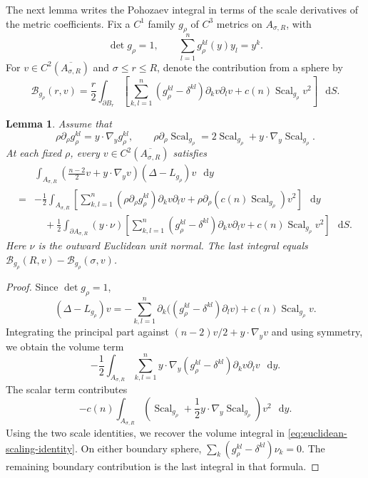 \documentclass[11pt]{article}
\numberwithin{equation}{section}
\newtheorem{lemma}[theorem]{Lemma}
\theoremstyle{remark}
\newcommand{\dd}{\mathop{}\!\mathrm{d}}
\begin{document}
The next lemma writes the Pohozaev integral in terms of the scale
derivatives of the metric coefficients. Fix a \(C^1\) family \(g_\rho\)
of \(C^3\) metrics on \(A_{\sigma,R}\), with
\[
 \det g_\rho=1,\qquad
 \sum_{l=1}^ng_\rho^{kl}(y)y_l=y^k.
\]
For \(v\in C^2(\overline{A_{\sigma,R}})\) and \(\sigma\le r\le R\),
denote the contribution from a sphere by
\begin{equation}\label{eq:scaling-boundary-term}
 \mathcal B_{g_\rho}(r,v)
 =\frac r2\int_{\partial B_r}
 \left[
 \sum_{k,l=1}^n(g_\rho^{kl}-\delta^{kl})\partial_kv\partial_lv
 +c(n)\operatorname{Scal}_{g_\rho}v^2
 \right]\,\dd S.
\end{equation}

\begin{lemma}\label{lem:euclidean-scaling-identity}
Assume that
\[
 \rho\partial_\rho g_\rho^{kl}=y\cdot\nabla_y g_\rho^{kl},
 \qquad
 \rho\partial_\rho \operatorname{Scal}_{g_\rho}
 =2\operatorname{Scal}_{g_\rho}+y\cdot\nabla_y\operatorname{Scal}_{g_\rho}.
\]
At each fixed \(\rho\), every \(v\in C^2(\overline{A_{\sigma,R}})\)
satisfies
\begin{equation}\label{eq:euclidean-scaling-identity}
 \begin{aligned}
 &\int_{A_{\sigma,R}}
 \left(\frac{n-2}{2}v+y\cdot\nabla_yv\right)
 (\Delta-L_{g_\rho})v\,\dd y\\
 {}={}&-\frac12\int_{A_{\sigma,R}}
 \left[
 \sum_{k,l=1}^n(\rho\partial_\rho g_\rho^{kl})\partial_kv\partial_lv
 +\rho\partial_\rho(c(n)\operatorname{Scal}_{g_\rho})v^2
 \right]\,\dd y\\
 &\quad+\frac12\int_{\partial A_{\sigma,R}}(y\cdot\nu)
 \left[
 \sum_{k,l=1}^n(g_\rho^{kl}-\delta^{kl})\partial_kv\partial_lv
 +c(n)\operatorname{Scal}_{g_\rho}v^2
 \right]\,\dd S.
 \end{aligned}
\end{equation}
Here \(\nu\) is the outward Euclidean unit normal. The last integral equals
\(\mathcal B_{g_\rho}(R,v)-\mathcal B_{g_\rho}(\sigma,v)\).
\end{lemma}

\begin{proof}
Since \(\det g_\rho=1\),
\[
 (\Delta-L_{g_\rho})v
 =-\sum_{k,l=1}^n
 \partial_k\bigl((g_\rho^{kl}-\delta^{kl})\partial_lv\bigr)
 +c(n)\operatorname{Scal}_{g_\rho}v.
\]
{Integrating the principal part against
\((n-2)v/2+y\cdot\nabla_yv\) and using symmetry, we obtain the volume
term}
\[
 -\frac12\int_{A_{\sigma,R}}\sum_{k,l=1}^n
 y\cdot\nabla_y(g_\rho^{kl}-\delta^{kl})\partial_kv\partial_lv\,\dd y.
\]
The scalar term contributes
\[
 -c(n)\int_{A_{\sigma,R}}
 \left(\operatorname{Scal}_{g_\rho}+\frac12y\cdot\nabla_y\operatorname{Scal}_{g_\rho}\right)v^2\,\dd y.
\]
{Using the two scale identities, we recover the volume
integral in \eqref{eq:euclidean-scaling-identity}.} On either boundary sphere,
\(\sum_k(g_\rho^{kl}-\delta^{kl})\nu_k=0\). The remaining boundary
contribution is the last integral in that formula.
\end{proof}
\end{document}
